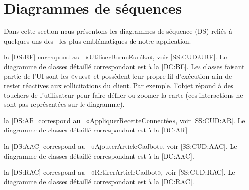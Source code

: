 \chapter{Diagrammes de séquences}

Dans cette section nous présentons les diagrammes de séquence (DS) reliés à quelques-uns des \cu\ les plus emblématiques de notre application.

\startitemize
\item la [DS:BE] correspond au \cu\ «UtiliserBorneEuréka», voir [SS:CUD:UBE].
Le diagramme de classes détaillé correspondant est à la [DC:BE].
Les classes faisant partie de l'UI sont les «vues» et possèdent leur propre fil d'exécution afin de rester réactives aux sollicitations du client.
Par exemple, l'objet  répond à des touchers de l'utilisateur pour faire défiler ou zoomer la carte (ces interactions ne sont pas représentées sur le diagramme).

\item la [DS:AR] correspond au \cu\ «AppliquerRecetteConnectée», voir [SS:CUD:AR].
Le diagramme de classes détaillé correspondant est à la [DC:AR].


\item la [DS:AAC] correspond au \cu\ «AjouterArticleCadbot», voir [SS:CUD:AAC].
Le diagramme de classes détaillé correspondant est à la [DC:AAC].

\item la [DS:RAC] correspond au \cu\ «RetirerArticleCadbot», voir [SS:CUD:RAC].
Le diagramme de classes détaillé correspondant est à la [DC:RAC].


\stopitemize


{}

{}

{}

{}






